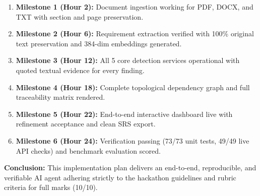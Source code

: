 \documentclass[11pt,a4paper]{article}
\begin{document}
\begin{enumerate}[label=\textbf{M\arabic*:}]
  \item \textbf{Milestone 1 (Hour 2):} Document ingestion working for PDF, DOCX, and TXT with section and page preservation.
  \item \textbf{Milestone 2 (Hour 6):} Requirement extraction verified with 100\% original text preservation and 384-dim embeddings generated.
  \item \textbf{Milestone 3 (Hour 12):} All 5 core detection services operational with quoted textual evidence for every finding.
  \item \textbf{Milestone 4 (Hour 18):} Complete topological dependency graph and full traceability matrix rendered.
  \item \textbf{Milestone 5 (Hour 22):} End-to-end interactive dashboard live with refinement acceptance and clean SRS export.
  \item \textbf{Milestone 6 (Hour 24):} Verification passing (73/73 unit tests, 49/49 live API checks) and benchmark evaluation scored.
\end{enumerate}

\vspace{6pt}
\begin{center}
  \small\textbf{Conclusion:} This implementation plan delivers an end-to-end, reproducible, and verifiable AI agent adhering strictly to the hackathon guidelines and rubric criteria for full marks (10/10).
\end{center}
\end{document}
